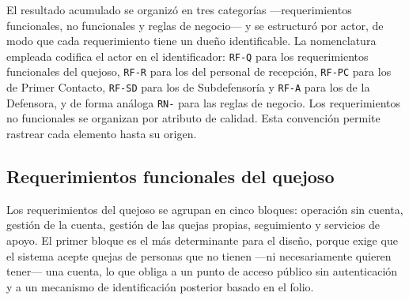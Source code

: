	El resultado acumulado se organizó en tres categorías ---requerimientos funcionales, no
	funcionales y reglas de negocio--- y se estructuró por actor, de modo que cada requerimiento
	tiene un dueño identificable. La nomenclatura empleada codifica el actor en el identificador:
	\texttt{RF-Q} para los requerimientos funcionales del quejoso, \texttt{RF-R} para los del
	personal de recepción, \texttt{RF-PC} para los de Primer Contacto, \texttt{RF-SD} para los de
	Subdefensoría y \texttt{RF-A} para los de la Defensora, y de forma análoga
	\texttt{RN-} para las reglas de negocio. Los requerimientos no funcionales se organizan por atributo de calidad. Esta convención permite rastrear cada elemento hasta su origen.
	
	\subsection{Requerimientos funcionales del quejoso}
	Los requerimientos del quejoso se agrupan en cinco bloques: operación sin cuenta, gestión de la
	cuenta, gestión de las quejas propias, seguimiento y servicios de apoyo. El primer bloque es el
	más determinante para el diseño, porque exige que el sistema acepte quejas de personas que no
	tienen ---ni necesariamente quieren tener--- una cuenta, lo que obliga a un punto de acceso
	público sin autenticación y a un mecanismo de identificación posterior basado en el folio.
	
	\small
	\renewcommand{\arraystretch}{1.2}
	\setlength{\tabcolsep}{4pt}
	
